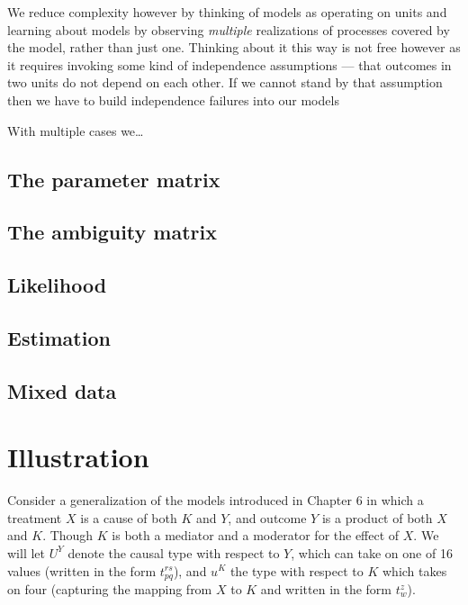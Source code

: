 \documentclass[12pt,]{book}
\begin{document}
We reduce complexity however by thinking of models as operating on units and learning about models by observing \emph{multiple} realizations of processes covered by the model, rather than just one. Thinking about it this way is not free however as it requires invoking some kind of independence assumptions --- that outcomes in two units do not depend on each other. If we cannot stand by that assumption then we have to build independence failures into our models

With multiple cases we\ldots{}

\hypertarget{the-parameter-matrix}{%
\subsection{The parameter matrix}\label{the-parameter-matrix}}

\hypertarget{the-ambiguity-matrix}{%
\subsection{The ambiguity matrix}\label{the-ambiguity-matrix}}

\hypertarget{likelihood}{%
\subsection{Likelihood}\label{likelihood}}

\hypertarget{estimation}{%
\subsection{Estimation}\label{estimation}}

\hypertarget{mixed-data}{%
\subsection{Mixed data}\label{mixed-data}}

\hypertarget{illustration}{%
\section{Illustration}\label{illustration}}

Consider a generalization of the models introduced in Chapter 6 in which a treatment \(X\) is a cause of both \(K\) and \(Y\), and outcome \(Y\) is a product of both \(X\) and \(K\). Though \(K\) is both a mediator and a moderator for the effect of \(X\). We will let \(U^Y\) denote the causal type with respect to \(Y\), which can take on one of 16 values (written in the form \(t_{pq}^{rs}\)), and \(u^K\) the type with respect to \(K\) which takes on four (capturing the mapping from \(X\) to \(K\) and written in the form \(t_{w}^{z}\)).
\end{document}

